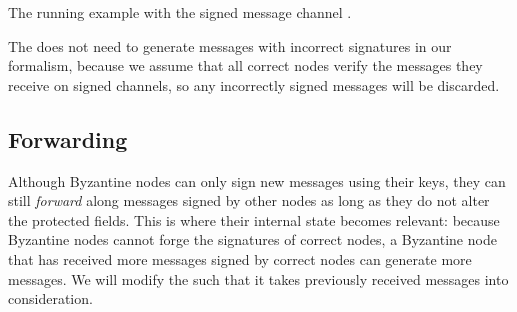 \begin{algorithm}[t]
\caption{The running example with the signed message channel \randomHarness{}.}
\label{alg:running-example-signed-harness}
\end{algorithm}

The \randomSimulator{} does not need to generate messages with incorrect signatures in our formalism, because we assume that all correct nodes verify the messages they receive on signed channels, so any incorrectly signed messages will be discarded.





\subsection{Forwarding}
\label{sec:forwarding}

Although Byzantine nodes can only sign new messages using their keys, they can still \emph{forward} along messages signed by other nodes as long as they do not alter the protected fields.
This is where their internal state becomes relevant: because Byzantine nodes cannot forge the signatures of correct nodes, a Byzantine node that has received more messages signed by correct nodes can generate more messages.
We will modify the \randomHarness{} such that it takes previously received messages into consideration.

